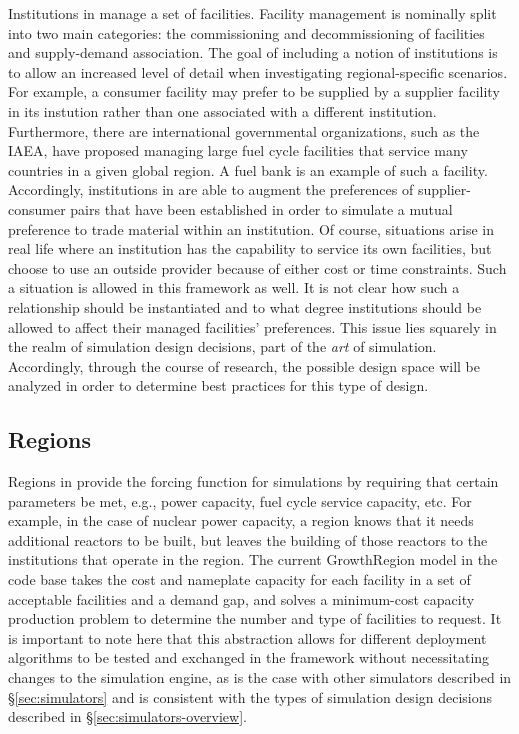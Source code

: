 Institutions in \Cyclus manage a set of facilities. Facility management is
nominally split into two main categories: the commissioning and decommissioning
of facilities and supply-demand association. The goal of including a notion of
institutions is to allow an increased level of detail when investigating
regional-specific scenarios. For example, a consumer facility may prefer to be
supplied by a supplier facility in its instution rather than one associated with
a different institution. Furthermore, there are international governmental
organizations, such as the IAEA, have proposed managing large fuel cycle
facilities that service many countries in a given global region. A fuel bank is
an example of such a facility. Accordingly, institutions in \Cyclus are able to
augment the preferences of supplier-consumer pairs that have been established in
order to simulate a mutual preference to trade material within an
institution. Of course, situations arise in real life where an institution has
the capability to service its own facilities, but choose to use an outside
provider because of either cost or time constraints. Such a situation is allowed
in this framework as well. It is not clear how such a relationship should be
instantiated and to what degree institutions should be allowed to affect their
managed facilities' preferences. This issue lies squarely in the realm of
simulation design decisions, part of the \textit{art} of
simulation. Accordingly, through the course of research, the possible design
space will be analyzed in order to determine best practices for this type of
design.

\subsection{Regions}

Regions in \Cyclus provide the forcing function for simulations by requiring
that certain parameters be met, e.g., power capacity, fuel cycle service
capacity, etc. For example, in the case of nuclear power capacity, a region
knows that it needs additional reactors to be built, but leaves the building of
those reactors to the institutions that operate in the region. The current
GrowthRegion model in the \Cycamore \cite{cycamore2013} code base takes the cost
and nameplate capacity for each facility in a set of acceptable facilities and a
demand gap, and solves a minimum-cost capacity production problem to determine
the number and type of facilities to request. It is important to note here that
this abstraction allows for different deployment algorithms to be tested and
exchanged in the \Cyclus framework without necessitating changes to the
simulation engine, as is the case with other simulators described
in \S\ref{sec:simulators} and is consistent with the types of simulation design
decisions described in
\S\ref{sec:simulators-overview}. 

